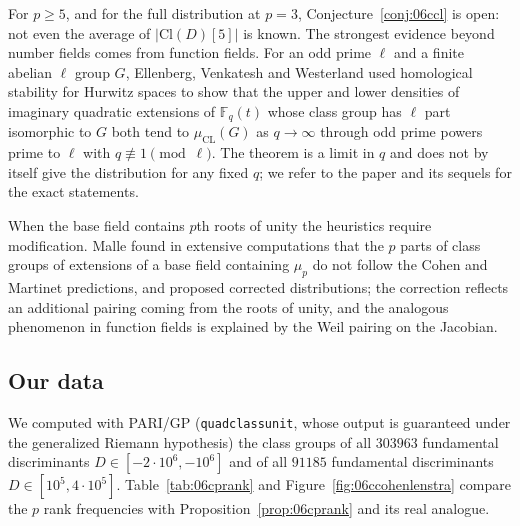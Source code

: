 For $p\ge5$, and for the full distribution at $p = 3$, Conjecture~\ref{conj:06ccl} is open: not even the average of $|\mathrm{Cl}(D)[5]|$ is known. The strongest evidence beyond number fields comes from function fields. For an odd prime $\ell$ and a finite abelian $\ell$ group $G$, Ellenberg, Venkatesh and Westerland \cite{evw2016} used homological stability for Hurwitz spaces to show that the upper and lower densities of imaginary quadratic extensions of $\mathbb{F}_q(t)$ whose class group has $\ell$ part isomorphic to $G$ both tend to $\mu_{\mathrm{CL}}(G)$ as $q\to\infty$ through odd prime powers prime to $\ell$ with $q\not\equiv1\pmod\ell$. The theorem is a limit in $q$ and does not by itself give the distribution for any fixed $q$; we refer to the paper and its sequels for the exact statements.

When the base field contains $p$th roots of unity the heuristics require modification. Malle \cite{malle2008} found in extensive computations that the $p$ parts of class groups of extensions of a base field containing $\mu_p$ do not follow the Cohen and Martinet predictions, and proposed corrected distributions; the correction reflects an additional pairing coming from the roots of unity, and the analogous phenomenon in function fields is explained by the Weil pairing on the Jacobian.

\subsection{Our data}\label{sec:06cdata}

We computed with PARI/GP (\texttt{quadclassunit}, whose output is guaranteed under the generalized Riemann hypothesis) the class groups of all $303963$ fundamental discriminants $D\in[-2\cdot10^6,-10^6]$ and of all $91185$ fundamental discriminants $D\in[10^5,4\cdot10^5]$. Table~\ref{tab:06cprank} and Figure~\ref{fig:06ccohenlenstra} compare the $p$ rank frequencies with Proposition~\ref{prop:06cprank} and its real analogue.

